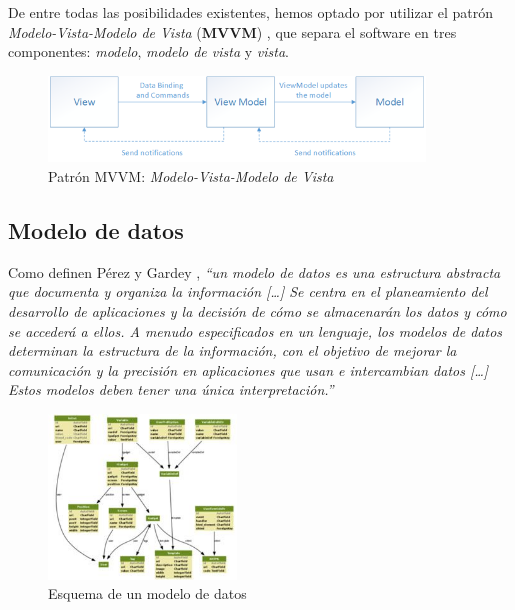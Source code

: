 De entre todas las posibilidades existentes, hemos optado por utilizar el patrón \textit{Modelo-Vista-Modelo de Vista} (\textbf{MVVM})
\autocite*{MicrosoftMVVM}, que separa el software en tres componentes: \textit{modelo}, \textit{modelo de vista} y \textit{vista}.\medskip

\begin{figure}[H]
    \centering
    \includegraphics[width=10cm]{Images/mvvm.png}
    \caption{Patrón MVVM: \textit{Modelo-Vista-Modelo de Vista} \autocite*{MicrosoftMVVM}}
\end{figure}

\subsection{Modelo de datos} \label{Modelo_Datos}
Como definen Pérez y Gardey \autocite*{Perez2017}, \textit{“un modelo de datos es una estructura abstracta que 
documenta y organiza la información [\dots] Se centra en el planeamiento del desarrollo de aplicaciones y la decisión de 
cómo se almacenarán los datos y cómo se accederá a ellos. A menudo especificados en un lenguaje, los modelos de datos 
determinan la estructura de la información, con el objetivo de mejorar la comunicación y la precisión en aplicaciones 
que usan e intercambian datos [\dots] Estos modelos deben tener una única interpretación.”} \medskip

\begin{figure}[H]
    \centering
    \includegraphics[width=5cm]{Figures/modelo_datos.jpg}
    \caption{Esquema de un modelo de datos \autocite*{Perez2017}}
\end{figure}

